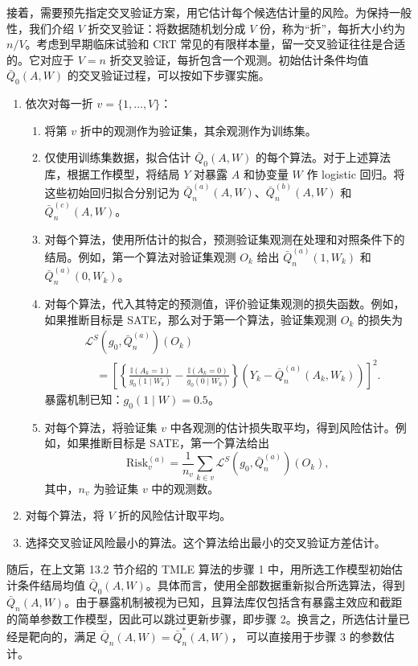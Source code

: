 接着，需要预先指定交叉验证方案，用它估计每个候选估计量的风险。为保持一般性，我们介绍 $V$ 折交叉验证：将数据随机划分成 $V$ 份，称为“折”，每折大小约为 $n/V$。考虑到早期临床试验和 CRT 常见的有限样本量，留一交叉验证往往是合适的。它对应于 $V=n$ 折交叉验证，每折包含一个观测。初始估计条件均值 $\bar Q_0(A,W)$ 的交叉验证过程，可以按如下步骤实施。
\begin{enumerate}[label=(\Alph*)]
 \item 依次对每一折 $v=\{1,\ldots,V\}$：
 \begin{enumerate}[label=(\alph*)]
  \item 将第 $v$ 折中的观测作为验证集，其余观测作为训练集。
  \item 仅使用训练集数据，拟合估计 $\bar Q_0(A,W)$ 的每个算法。对于上述算法库，根据工作模型，将结局 $Y$ 对暴露 $A$ 和协变量 $W$ 作 logistic 回归。将这些初始回归拟合分别记为
  $\bar Q_n^{(a)}(A,W)$、$\bar Q_n^{(b)}(A,W)$ 和 $\bar Q_n^{(c)}(A,W)$。
  \item 对每个算法，使用所估计的拟合，预测验证集观测在处理和对照条件下的结局。例如，第一个算法对验证集观测 $O_k$ 给出 $\bar Q_n^{(a)}(1,W_k)$ 和 $\bar Q_n^{(a)}(0,W_k)$。
  \item 对每个算法，代入其特定的预测值，评价验证集观测的损失函数。例如，如果推断目标是 SATE，那么对于第一个算法，验证集观测 $O_k$ 的损失为
  \[
   \begin{aligned}
   &\mathcal L^S(g_0,\bar Q_n^{(a)})(O_k)\\
   &\quad=\left[\left\{\frac{\mathbb I(A_k=1)}{g_0(1\mid W_k)}
             -\frac{\mathbb I(A_k=0)}{g_0(0\mid W_k)}\right\}
          (Y_k-\bar Q_n^{(a)}(A_k,W_k))\right]^2.
   \end{aligned}
  \]
  暴露机制已知：$g_0(1\mid W)=0.5$。
  \item 对每个算法，将验证集 $v$ 中各观测的估计损失取平均，得到风险估计。例如，如果推断目标是 SATE，第一个算法给出
  \[
   \mathrm{Risk}_v^{(a)}
   =\frac1{n_v}\sum_{k\in v}\mathcal L^S(g_0,\bar Q_n^{(a)})(O_k),
  \]
  其中，$n_v$ 为验证集 $v$ 中的观测数。
 \end{enumerate}
 \item 对每个算法，将 $V$ 折的风险估计取平均。
 \item 选择交叉验证风险最小的算法。这个算法给出最小的交叉验证方差估计。
\end{enumerate}

随后，在上文第 13.2 节介绍的 TMLE 算法的步骤 1 中，用所选工作模型初始估计条件结局均值 $\bar Q_0(A,W)$。具体而言，使用全部数据重新拟合所选算法，得到 $\bar Q_n(A,W)$。由于暴露机制被视为已知，且算法库仅包括含有暴露主效应和截距的简单参数工作模型，因此可以跳过更新步骤，即步骤 2。换言之，所选估计量已经是靶向的，满足
$\bar Q_n(A,W)=\bar Q_n^*(A,W)$，
可以直接用于步骤 3 的参数估计。

